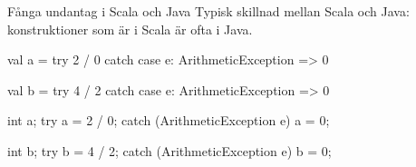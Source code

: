 \begin{Slide}{Fånga undantag i Scala och Java}
Typisk skillnad mellan Scala och Java:\\konstruktioner som är  i Scala är ofta  i Java.
\begin{multicols}{2}
  \noindent{}
\begin{CodeSmall}[basicstyle=\ttfamily\SlideFontSize{6}{8},backgroundcolor=\color{white},
  frame=none]
val a = try 2 / 0 catch
  case e: ArithmeticException => 0


val b = try 4 / 2 catch 
  case e: ArithmeticException => 0
\end{CodeSmall}

\columnbreak

\noindent{}
\begin{CodeSmall}[language=Java,basicstyle=\ttfamily\SlideFontSize{6}{8},backgroundcolor=\color{white},
  frame=none]
int a;
try {
    a = 2 / 0;
} catch (ArithmeticException e) {
    a = 0;
}

int b;
try {
    b = 4 / 2;
} catch (ArithmeticException e) {
    b = 0;
}

\end{CodeSmall}
\end{multicols}
\end{Slide}




